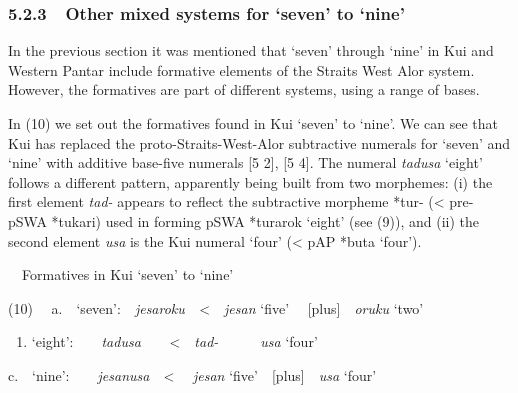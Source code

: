 \subsubsection[5.2.3\ \ Other mixed systems for {\textquoteleft}seven{\textquoteright} to {\textquoteleft}nine{\textquoteright}]{5.2.3\ \ Other mixed systems for {\textquoteleft}seven{\textquoteright} to {\textquoteleft}nine{\textquoteright}}
In the previous section it was mentioned that {\textquoteleft}seven{\textquoteright} through {\textquoteleft}nine{\textquoteright} in Kui and Western Pantar include formative elements of the Straits West Alor system. However, the formatives are part of different systems, using a range of bases.

In (10) we set out the formatives found in Kui {\textquoteleft}seven{\textquoteright} to {\textquoteleft}nine{\textquoteright}. We can see that Kui has replaced the proto-Straits-West-Alor subtractive numerals for {\textquoteleft}seven{\textquoteright} and {\textquoteleft}nine{\textquoteright} with additive base-five numerals [5 2], [5 4]. The numeral \textit{tadusa} {\textquoteleft}eight{\textquoteright} follows a different pattern, apparently being built from two morphemes: (i) the first element \textit{tad-} appears to reflect the subtractive morpheme *tur- ({\textless} pre-pSWA *tukari) used in forming pSWA *turarok {\textquoteleft}eight{\textquoteright} (see (9)), and (ii) the second element \textit{usa }is the Kui numeral {\textquoteleft}four{\textquoteright} ({\textless} pAP *buta {\textquoteleft}four{\textquoteright}). 

\ \ Formatives in Kui {\textquoteleft}seven{\textquoteright} to {\textquoteleft}nine{\textquoteright}

(10) \ \ a.\ \ {\textquoteleft}seven{\textquoteright}:\ \ \textit{j}\textit{esaroku\ \ }{\textless}\ \ \textit{jesan }{\textquoteleft}five{\textquoteright} \ \ [plus]\ \ \textit{oruku }{\textquoteleft}two{\textquoteright}

\begin{enumerate}
\item {\textquoteleft}eight{\textquoteright}:\ \ \ \ \textit{tadusa\ \ \ \ }{\textless}\ \ \textit{tad-}\ \ \ \ \ \ \textit{usa }{\textquoteleft}four{\textquoteright}
\end{enumerate}
c.\ \ {\textquoteleft}nine{\textquoteright}:\ \ \ \ \textit{je}\textit{sanusa}\ \ {\textless}  \ \ \textit{jesan }{\textquoteleft}five{\textquoteright}\ \ [plus]\ \ \textit{usa }{\textquoteleft}four{\textquoteright}

